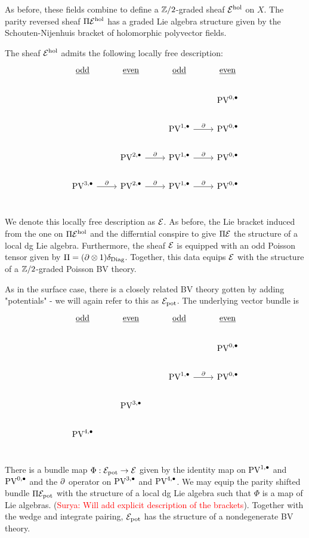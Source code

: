 \documentclass[11pt]{article}
\newcommand{\surya}[1]{(\textcolor{red}{Surya: #1})}
\newcommand\bu{\bullet}
\begin{document}
As before, these fields combine to define a $\mathbb{Z}/2$-graded sheaf $\mathcal{E}^{\rm hol}$ on $X$. The parity reversed sheaf $\Pi\mathcal{E}^{\rm hol}$ has a graded Lie algebra structure given by the Schouten-Nijenhuis bracket of holomorphic polyvector fields.

The sheaf $\mathcal{E}^{\rm hol}$ admits the following locally free description:
\[
\begin{tikzcd}
\ul{\rm odd} & \ul{\rm even} & \ul{\rm odd} & \ul{\rm even} \\
& & & \PV^{0,\bu} \\
& & \PV^{1,\bu} \ar[r, "\partial"] & \PV^{0,\bu} \\
& \PV^{2,\bu} \ar[r,"\del"] & \PV^{1,\bu} \ar[r, "\partial"] & \PV^{0,\bu} \\ 
\PV^{3,\bu}\ar[r, "\del"]& \PV^{2,\bu} \ar[r,"\del"] & \PV^{1,\bu} \ar[r, "\partial"] & \PV^{0,\bu} \\ 
\end{tikzcd}
\]

We denote this locally free description as $\mathcal{E}$. As before, the Lie bracket induced from the one on $\Pi\mathcal{E}^{\rm hol}$ and the differntial conspire to give $\Pi\mathcal{E}$ the structure of a local dg Lie algebra. Furthermore, the sheaf $\mathcal{E}$ is equipped with an odd Poisson tensor given by $\Pi = (\partial\otimes 1)\delta_{\rm Diag}$. Together, this data equips $\mathcal{E}$ with the structure of a $\mathbb{Z}/2$-graded Poisson BV theory.

As in the surface case, there is a closely related BV theory gotten by adding "potentials" - we will again refer to this as $\mathcal{E}_{\rm pot}$. The underlying vector bundle is 
\[
\begin{tikzcd}
\ul{\rm odd} & \ul{\rm even} & \ul{\rm odd} & \ul{\rm even} \\
& & & \PV^{0,\bu} \\
& & \PV^{1,\bu} \ar[r, "\partial"] & \PV^{0,\bu} \\
& \PV^{3,\bu} & &  \\ 
\PV^{4,\bu}&  &  & \\ 
\end{tikzcd}
\]

There is a bundle map $\Phi: \mathcal{E}_{\rm pot}\to \mathcal{E}$ given by the identity map on $\PV^{1,\bu}$ and $\PV^{0,\bu}$ and the $\partial$ operator on $\PV^{3,\bu}$ and $\PV^{4,\bu}$. We may equip the parity shifted bundle $\Pi\mathcal{E}_{\rm pot}$ with the structure of a local dg Lie algebra such that $\Phi$ is a map of Lie algebras. \surya{Will add explicit description of the brackets}. Together with the wedge and integrate pairing, $\mathcal{E}_{\rm pot}$ has the structure of a nondegenerate BV theory.
\end{document}
